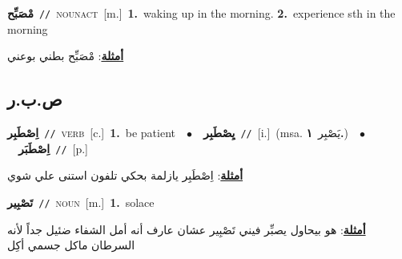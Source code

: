 \documentclass[10pt,a4paper,twoside]{article} %
\begin{document}
\begin{multicols}{2}
{{{{{\setlength\topsep{0pt}\textbf{\foreignlanguage{arabic}{مْصَبِّح}}\ {\color{gray}\texttt{//}\color{black}}\ \textsc{noun\textunderscore act}\ [m.]\ \textbf{1.}~waking up in the morning.  \textbf{2.}~experience sth in the morning\  \begin{flushright}\color{gray}\foreignlanguage{arabic}{\textbf{\underline{\foreignlanguage{arabic}{أمثلة}}}: مْصَبِّح بطني بوعني}\end{flushright}\color{black}} \vspace{2mm}

\vspace{-3mm}
\subsection*{\color{blue}\foreignlanguage{arabic}{ص.ب.ر}\color{blue}{}} 

{\setlength\topsep{0pt}\textbf{\foreignlanguage{arabic}{اِصْطَبِر}}\ {\color{gray}\texttt{//}\color{black}}\ \textsc{verb}\ [c.]\ \textbf{1.}~be patient\ \ $\bullet$\ \ \setlength\topsep{0pt}\textbf{\foreignlanguage{arabic}{يِصْطَبِر}}\ {\color{gray}\texttt{//}\color{black}}\ [i.]\ \color{gray}(msa. \foreignlanguage{arabic}{يَصْبِر}~\foreignlanguage{arabic}{\textbf{١.}})\color{black}\ \ $\bullet$\ \ \setlength\topsep{0pt}\textbf{\foreignlanguage{arabic}{اِصْطَبَر}}\ {\color{gray}\texttt{//}\color{black}}\ [p.]\  \begin{flushright}\color{gray}\foreignlanguage{arabic}{\textbf{\underline{\foreignlanguage{arabic}{أمثلة}}}: اِصْطَبِر يازلمة بحكي تلفون استنى علي شوي}\end{flushright}\color{black}} \vspace{2mm}

{\setlength\topsep{0pt}\textbf{\foreignlanguage{arabic}{تَصْبِير}}\ {\color{gray}\texttt{//}\color{black}}\ \textsc{noun}\ [m.]\ \textbf{1.}~solace\  \begin{flushright}\color{gray}\foreignlanguage{arabic}{\textbf{\underline{\foreignlanguage{arabic}{أمثلة}}}: هو بيحاول يصبِّر فيني تَصْبِير عشان عارف أنه أمل الشفاء ضئيل جداً لأنه السرطان ماكل جسمي أكِل}\end{flushright}\color{black}} \vspace{2mm}

}}}}
\end{multicols}
\end{document}
